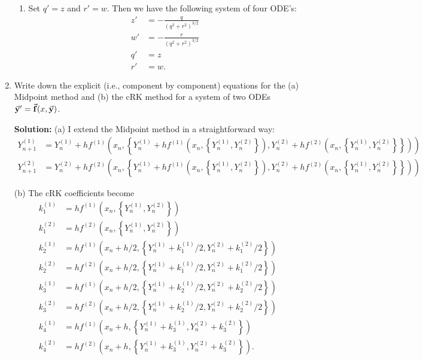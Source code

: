 \documentclass[11pt]{article}
\def\f{\frac }
\newcommand{\bvec}[1]{\vec{ {\bf #1 } }}
\begin{document}
\begin{enumerate}
\begin{enumerate}
\item Set $q' = z$ and $r' = w$. Then we have the following system of four ODE's:
\begin{align*} z' &= -\f{q}{(q^2+r^2)^{3/2}} \\
               w' &= - \f{r}{(q^2+r^2)^{3/2}} \\
               q' &= z\\
               r' &= w.\end{align*}

\end{enumerate}

\clearpage
\pagebreak
\item Write down the explicit (i.e., component by component) equations for the (a) Midpoint method and (b) the cRK method for a system of two ODEs
$\bvec{y}' = \bvec{f} (x,\bvec{y})$.

\bigskip
\textbf{Solution:} (a) I extend the Midpoint method in a straightforward way:
\begin{align*} Y_{n+1} ^{(1)} &= Y_{n} ^{(1)} + h f ^{(1)} \left( x_n, \left\{ Y^{(1)} _n + hf ^{(1)} \left( x_n, \left\{Y^{(1)} _n , Y^{(2)} _n \right\}\right) , Y^{(2)} _n + hf ^{(2)} \left( x_n, \left\{Y^{(1)} _n , Y^{(2)} _n \right\} \right\}\right)\right)\\
Y_{n+1} ^{(2)} &= Y_{n} ^{(2)} + h f ^{(2)} \left( x_n, \left\{ Y^{(1)} _n + hf ^{(1)} \left( x_n, \left\{Y^{(1)} _n , Y^{(2)} _n \right\}\right) , Y^{(2)} _n + hf ^{(2)} \left( x_n, \left\{Y^{(1)} _n , Y^{(2)} _n \right\} \right\}\right)\right) \end{align*}

(b) The cRK coefficients become
\begin{align*} k_1 ^{(1)} &= hf^{(1)} \left (x_n, \left\{ Y^{(1)}_n, Y^{(2)}_n \right\} \right ) \\
k_1 ^{(2)} &= hf^{(2)} \left (x_n, \left\{ Y^{(1)}_n , Y^{(2)}_n \right\} \right ) \\
k_2 ^{(1)} &= hf^{(1)} \left (x_n+h/2, \left\{ Y^{(1)}_n + k_1 ^{(1)}/2, Y^{(2)}_n + k_1 ^{(2)}/2\right\} \right ) \\
k_2 ^{(2)} &= hf^{(2)} \left (x_n+h/2, \left\{ Y^{(1)}_n + k_1 ^{(1)}/2, Y^{(2)}_n + k_1 ^{(2)}/2\right\} \right) \\
k_3 ^{(1)} &= hf^{(1)} \left (x_n+h/2, \left\{ Y^{(1)}_n + k_2 ^{(1)}/2, Y^{(2)}_n + k_2 ^{(2)}/2\right\} \right ) \\
k_3 ^{(2)} &= hf^{(2)} \left (x_n+h/2, \left\{ Y^{(1)}_n + k_2 ^{(1)}/2, Y^{(2)}_n + k_2 ^{(2)}/2\right\} \right ) \\
k_4 ^{(1)} &= hf^{(1)} \left (x_n+h, \left\{ Y^{(1)}_n + k_3 ^{(1)}, Y^{(2)}_n + k_3 ^{(2)}\right\} \right ) \\
k_4 ^{(2)} &= hf^{(2)} \left (x_n+h, \left\{ Y^{(1)}_n + k_3 ^{(1)}, Y^{(2)}_n + k_3 ^{(2)}\right\} \right ) . \end{align*} 


\end{enumerate}
\end{document}
